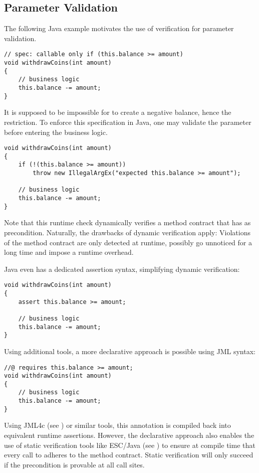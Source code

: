 
\subsection{Parameter Validation}
\label{ssec:argument-validation}
The following Java example motivates the use of verification for parameter validation.
\begin{lstlisting}
// spec: callable only if (this.balance >= amount)
void withdrawCoins(int amount)
{
    // business logic
    this.balance -= amount;
}
\end{lstlisting}
It is supposed to be impossible for  to create a negative balance, hence the restriction.
To enforce this specification in Java, one may validate the parameter  before entering the business logic.
\begin{lstlisting}
void withdrawCoins(int amount)
{
    if (!(this.balance >= amount))
        throw new IllegalArgEx("expected this.balance >= amount");
        
    // business logic
    this.balance -= amount;
}
\end{lstlisting}

Note that this runtime check dynamically verifies a method contract that has  as precondition.
Naturally, the drawbacks of dynamic verification apply:
Violations of the method contract are only detected at runtime, possibly go unnoticed for a long time and impose a runtime overhead.

Java even has a dedicated assertion syntax, simplifying dynamic verification:
\begin{lstlisting}
void withdrawCoins(int amount)
{
    assert this.balance >= amount;
    
    // business logic
    this.balance -= amount;
}
\end{lstlisting}

Using additional tools, a more declarative approach is possible using JML syntax:
\begin{lstlisting}
//@ requires this.balance >= amount;
void withdrawCoins(int amount)
{
    // business logic
    this.balance -= amount;
}
\end{lstlisting}

Using JML4c (see \cite{sarcar2010new}) or similar tools, this annotation is compiled back into equivalent runtime assertions.
However, the declarative approach also enables the use of static verification tools like ESC/Java (see \cite{leino2000esc}) to ensure at compile time that every call to  adheres to the method contract.
Static verification will only succeed if the precondition is provable at all call sites.


